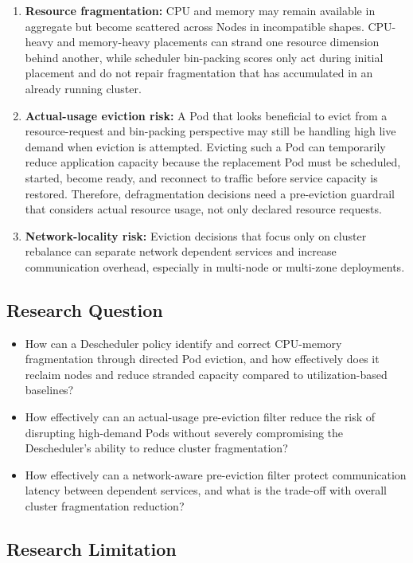 \begin{enumerate}
    \item \textbf{Resource fragmentation:} CPU and memory may remain available in aggregate but become scattered across Nodes in incompatible shapes. CPU-heavy and memory-heavy placements can strand one resource dimension behind another, while scheduler bin-packing scores only act during initial placement and do not repair fragmentation that has accumulated in an already running cluster.
    \item \textbf{Actual-usage eviction risk:} A Pod that looks beneficial to evict from a resource-request and bin-packing perspective may still be handling high live demand when eviction is attempted. Evicting such a Pod can temporarily reduce application capacity because the replacement Pod must be scheduled, started, become ready, and reconnect to traffic before service capacity is restored. Therefore, defragmentation decisions need a pre-eviction guardrail that considers actual resource usage, not only declared resource requests.
    \item \textbf{Network-locality risk:} Eviction decisions that focus only on cluster rebalance can separate network dependent services and increase communication overhead, especially in multi-node or multi-zone deployments.
\end{enumerate}

\subsection{Research Question}
\label{sec:researchQuestion}

\begin{itemize}
    \item How can a Descheduler policy identify and correct CPU-memory fragmentation through directed Pod eviction, and how effectively does it reclaim nodes and reduce stranded capacity compared to utilization-based baselines?
    \item How effectively can an actual-usage pre-eviction filter reduce the risk of disrupting high-demand Pods without severely compromising the Descheduler's ability to reduce cluster fragmentation?
    \item How effectively can a network-aware pre-eviction filter protect communication latency between dependent services, and what is the trade-off with overall cluster fragmentation reduction?
\end{itemize}

\subsection{Research Limitation}
\label{sec:researchLimitation}

